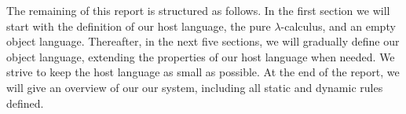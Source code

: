 The remaining of this report is structured as follows.
In the first section we will start with the definition of our host language,
the pure $\lambda$-calculus,
and an empty object language.
Thereafter, in the next five sections, we will gradually define our object language,
extending the properties of our host language when needed.
We strive to keep the host language as small as possible.
At the end of the report,
we will give an overview of our our system,
including all static and dynamic rules defined.
